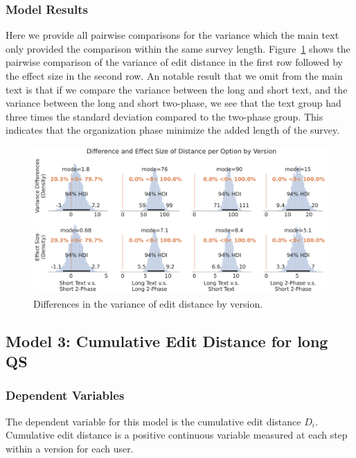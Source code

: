 \subsubsection{Model Results}
Here we provide all pairwise comparisons for the variance which the main text only provided the comparison within the same survey length. Figure~\ref{fig:bayesian_distance_variance} shows the pairwise comparison of the variance of edit distance in the first row followed by the effect size in the second row. An notable result that we omit from the main text is that if we compare the variance between the long and short text, and the variance between the long and short two-phase, we see that the text group had three times the standard deviation compared to the two-phase group. This indicates that the organization phase minimize the added length of the survey.

\begin{figure}[h!]
    \centering
    \includegraphics[width=\textwidth]{content/image/distance/distance_diff_per_option_effect_size_by_version_all.pdf}
    \caption{Differences in the variance of edit distance by version.}
    \label{fig:bayesian_distance_variance}
\end{figure}

\subsection{Model 3: Cumulative Edit Distance for long QS} \label{sec:apdx:model_cum_distance}

\subsubsection{Dependent Variables}
The dependent variable for this model is the cumulative edit distance \( D_i \). Cumulative edit distance is a positive continuous variable measured at each step within a version for each user.

